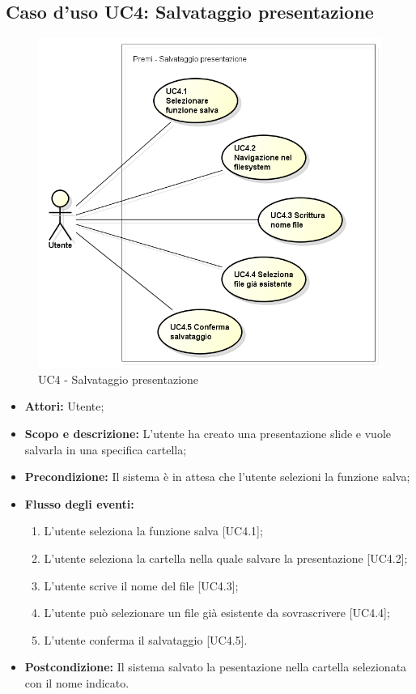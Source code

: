 \subsection{Caso d'uso UC4: Salvataggio presentazione}
\begin{figure}[h] 
	\centering 
	\includegraphics[scale=0.45] {img/UC4.png} 
	\caption{UC4 - Salvataggio presentazione} 
\end{figure}

\begin{itemize}
	\item \textbf{Attori:} Utente;
	\item \textbf{Scopo e descrizione:} L'utente ha creato una presentazione slide e vuole salvarla in una specifica cartella;
	\item \textbf{Precondizione:} Il sistema è in attesa che l'utente selezioni la funzione salva;
	\item \textbf{Flusso degli eventi:}
	\begin{enumerate}
		\item L'utente seleziona la funzione salva [UC4.1];
		\item L'utente seleziona la cartella nella quale salvare la presentazione [UC4.2];
		\item L'utente scrive il nome del file [UC4.3];
		\item L'utente può selezionare un file già esistente da sovrascrivere [UC4.4];
		\item L'utente conferma il salvataggio [UC4.5].
	\end{enumerate}
	\item \textbf{Postcondizione:} Il sistema salvato la pesentazione nella cartella selezionata con il nome indicato.
\end{itemize}

